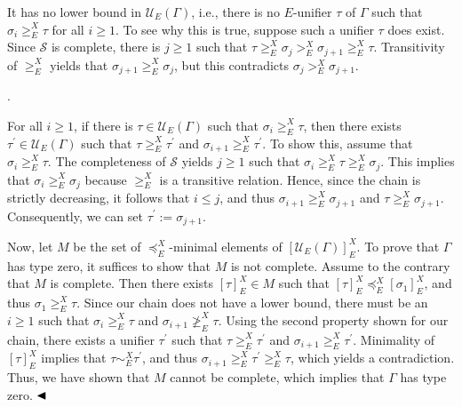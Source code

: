 It has no lower bound in $\mathcal{U}_{E}(\Gamma)$, i.e., there is no $E$-unifier $\tau$ of $\Gamma$ such that $\sigma_{i}\geq_{E}^{X}\tau$ for all $i\geq 1$. To see why this is true, suppose such a unifier $\tau$ does exist. Since $\mathcal{S}$ is complete, there is $j\geq 1$ such that $\tau\geq_{E}^{X}\sigma_{j}>_{E}^{X}\sigma_{j+1}\geq_{E}^{X}\tau$. Transitivity of $\geq_{E}^{X}$ yields that $\sigma_{j+1}\geq_{E}^{X}\sigma_{j}$, but this contradicts $\sigma_{j}>_{E}^{X}\sigma_{j+1}$.\par
 
 
 
\par{}. 
 
For all $i\geq 1$, if there is $\tau\in\mathcal{U}_{E}(\Gamma)$ such that $\sigma_{i}\geq_{E}^{X}\tau$, then there exists $\tau^{\prime}\in\mathcal{U}_{E}(\Gamma)$ such that $\tau\geq_{E}^{X}\tau^{\prime}$ and $\sigma_{i+1}\geq_{E}^{X}\tau^{\prime}$. To show this, assume that $\sigma_{i}\geq_{E}^{X}\tau$. The completeness of $\mathcal{S}$ yields $j\geq 1$ such that $\sigma_{i}\geq_{E}^{X}\tau\geq_{E}^{X}\sigma_{j}$. This implies that $\sigma_{i}\geq_{E}^{X}\sigma_{j}$ because $\geq_{E}^{X}$ is a transitive relation. Hence, since the chain is strictly decreasing, it follows that $i\leq j$, and thus $\sigma_{i+1}\geq_{E}^{X}\sigma_{j+1}$ and $\tau\geq_{E}^{X}\sigma_{j+1}$. Consequently, we can set $\tau^{\prime}:=\sigma_{j+1}$.\par
 
 
  
Now, let $M$ be the set of $\preceq_{E}^{X}$-minimal elements of $[\mathcal{U}_{E}(\Gamma)]_{E}^{X}$. To prove that $\Gamma$ has type zero, it suffices to show that $M$ is not complete. Assume to the contrary that $M$ is complete. Then there exists $[\tau]^{X}_{E}\in M$ such that $[\tau]^{X}_{E}\preceq_{E}^{X}[\sigma_{1}]^{X}_{E}$, and thus $\sigma_{1}\geq_{E}^{X}\tau$. Since our chain does not have a lower bound, there must be an $i\geq 1$ such that $\sigma_{i}\geq_{E}^{X}\tau$ and $\sigma_{i+1}\not\geq_{E}^{X}\tau$. Using the second property shown for our chain, there exists a unifier $\tau^{\prime}$ such that $\tau\geq_{E}^{X}\tau^{\prime}$ and $\sigma_{i+1}\geq_{E}^{X}\tau^{\prime}$. Minimality of $[\tau]^{X}_{E}$ implies that $\tau\sim_{E}^{X}\tau^{\prime}$, and thus $\sigma_{i+1}\geq_{E}^{X}\tau^{\prime}\geq_{E}^{X}\tau$, which yields a contradiction. Thus, we have shown that $M$ cannot be complete, which implies that $\Gamma$ has type zero. $\hfill\blacktriangleleft$\par
 
